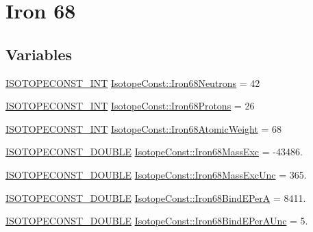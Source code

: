 \hypertarget{group___isotope_const-_iron-_fe68}{}\section{Iron 68}
\label{group___isotope_const-_iron-_fe68}
\subsection*{Variables}
\begin{DoxyCompactItemize}
\item 
\mbox{\hyperlink{group___isotope_const-_macros_ga5f18360b3e99483a35c32d789e62621c}{I\+S\+O\+T\+O\+P\+E\+C\+O\+N\+S\+T\+\_\+\+I\+NT}} \mbox{\hyperlink{group___isotope_const-_iron-_fe68_gaf95d5eceb00630cd26ca19f9e79baaa1}{Isotope\+Const\+::\+Iron68\+Neutrons}} = 42
\item 
\mbox{\hyperlink{group___isotope_const-_macros_ga5f18360b3e99483a35c32d789e62621c}{I\+S\+O\+T\+O\+P\+E\+C\+O\+N\+S\+T\+\_\+\+I\+NT}} \mbox{\hyperlink{group___isotope_const-_iron-_fe68_ga942f0c74d79a7b897f88ab645b202bb8}{Isotope\+Const\+::\+Iron68\+Protons}} = 26
\item 
\mbox{\hyperlink{group___isotope_const-_macros_ga5f18360b3e99483a35c32d789e62621c}{I\+S\+O\+T\+O\+P\+E\+C\+O\+N\+S\+T\+\_\+\+I\+NT}} \mbox{\hyperlink{group___isotope_const-_iron-_fe68_ga755545901fecea7f088b02fbf471f201}{Isotope\+Const\+::\+Iron68\+Atomic\+Weight}} = 68
\item 
\mbox{\hyperlink{group___isotope_const-_macros_ga8f45a7272ce02c0b4c65c44636ed719a}{I\+S\+O\+T\+O\+P\+E\+C\+O\+N\+S\+T\+\_\+\+D\+O\+U\+B\+LE}} \mbox{\hyperlink{group___isotope_const-_iron-_fe68_gaa81ef4dcb37b3969d840295eed13225e}{Isotope\+Const\+::\+Iron68\+Mass\+Exc}} = -\/43486.
\item 
\mbox{\hyperlink{group___isotope_const-_macros_ga8f45a7272ce02c0b4c65c44636ed719a}{I\+S\+O\+T\+O\+P\+E\+C\+O\+N\+S\+T\+\_\+\+D\+O\+U\+B\+LE}} \mbox{\hyperlink{group___isotope_const-_iron-_fe68_ga457622117dc9a7d6d1971cf5d77f937d}{Isotope\+Const\+::\+Iron68\+Mass\+Exc\+Unc}} = 365.
\item 
\mbox{\hyperlink{group___isotope_const-_macros_ga8f45a7272ce02c0b4c65c44636ed719a}{I\+S\+O\+T\+O\+P\+E\+C\+O\+N\+S\+T\+\_\+\+D\+O\+U\+B\+LE}} \mbox{\hyperlink{group___isotope_const-_iron-_fe68_gab846eb7ea65012442d7c04c59df6b473}{Isotope\+Const\+::\+Iron68\+Bind\+E\+PerA}} = 8411.
\item 
\mbox{\hyperlink{group___isotope_const-_macros_ga8f45a7272ce02c0b4c65c44636ed719a}{I\+S\+O\+T\+O\+P\+E\+C\+O\+N\+S\+T\+\_\+\+D\+O\+U\+B\+LE}} \mbox{\hyperlink{group___isotope_const-_iron-_fe68_gada36a0183158618cdf75e6b03b8a9617}{Isotope\+Const\+::\+Iron68\+Bind\+E\+Per\+A\+Unc}} = 5.

\end{DoxyCompactItemize}
